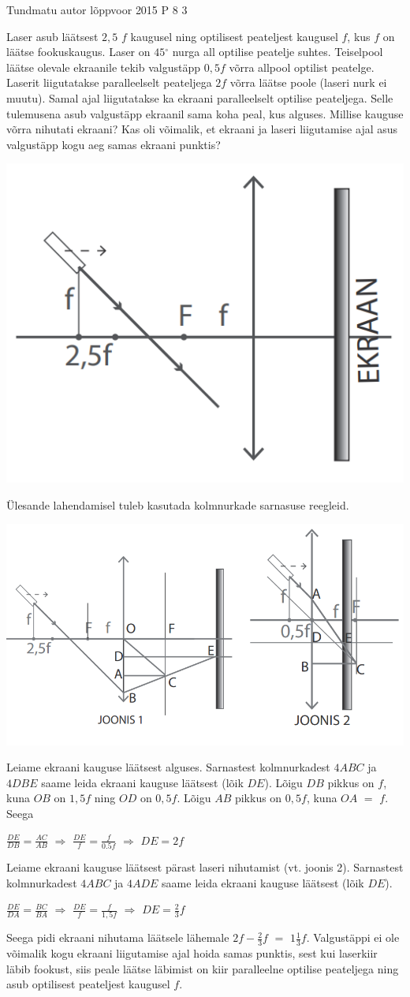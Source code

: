 {Tundmatu autor} %
{lõppvoor} %
{2015} %
{P 8} %
{3} %
{
\ifStatement
Laser asub läätsest $2,5$ $f$ kaugusel ning optilisest peateljest kaugusel $f$, kus $f$ on läätse fookuskaugus. Laser on $45$$^{\circ}$ nurga all optilise peatelje suhtes. Teiselpool läätse olevale ekraanile tekib valgustäpp $0,5f$ võrra allpool optilist peatelge. Laserit liigutatakse paralleelselt peateljega $2f$ võrra läätse poole (laseri nurk ei muutu). Samal ajal liigutatakse ka ekraani paralleelselt optilise peateljega. Selle tulemusena asub valgustäpp ekraanil sama koha peal, kus alguses. Millise kauguse võrra nihutati ekraani? Kas oli võimalik, et ekraani ja laseri liigutamise ajal asus valgustäpp kogu aeg samas ekraani punktis?
\begin{center}
	\includegraphics[width=0.5\linewidth]{2015-v3p-08-yl.PNG}
\end{center}
\fi
\ifHint
Ülesande lahendamisel tuleb kasutada kolmnurkade sarnasuse reegleid.
\fi
\ifSolution
\begin{center}
	\includegraphics[width=0.5\linewidth]{2015-v3p-08-lah.PNG}
\end{center}
Leiame ekraani kauguse läätsest alguses. Sarnastest kolmnurkadest $4ABC$ ja $4DBE$ saame leida ekraani kauguse läätsest (lõik $DE$). Lõigu $DB$ pikkus on $f$, kuna $OB$ on $1,5f$ ning $OD$ on $0,5f$. 
Lõigu $AB$ pikkus on $0,5f$, kuna $OA$ $=$ $f$. Seega
\begin{center}
$\frac{DE}{DB} = \frac{AC}{AB}$ 
$\Rightarrow$
$\frac{DE}{f} = \frac{f}{0.5f}$
$\Rightarrow$
$DE = 2f$
\end{center}
Leiame ekraani kauguse läätsest pärast laseri nihutamist (vt. joonis 2). Sarnastest kolmnurkadest $4ABC$ ja $4ADE$ saame leida ekraani kauguse läätsest (lõik $DE$).
\begin{center}
$\frac{DE}{DA} = \frac{BC}{BA}$ $\Rightarrow$ $\frac{DE}{f} = \frac{f}{1,5f}$ $\Rightarrow$ $DE = \frac{2}{3}f$
\end{center}
Seega pidi ekraani nihutama läätsele lähemale $2f - \frac{2}{3} f$ $=$ $1 \frac{1}{3}f$. Valgustäppi ei ole võimalik kogu ekraani liigutamise ajal hoida samas punktis, sest kui laserkiir läbib fookust, siis peale läätse läbimist on kiir paralleelne optilise peateljega ning asub optilisest peateljest kaugusel $f$.
\fi
}